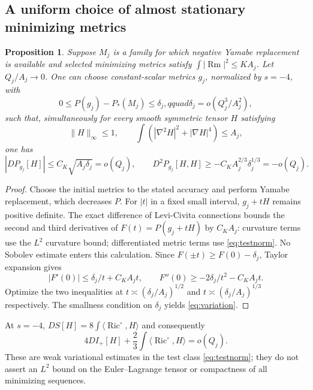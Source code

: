 \documentclass[11pt,a4paper]{article}
\newtheorem{proposition}[theorem]{Proposition}
\theoremstyle{definition}\newtheorem{definition}[theorem]{Definition}
\theoremstyle{remark}\newtheorem{remark}[theorem]{Remark}
\newcommand{\Ric}{\operatorname{Ric}}
\newcommand{\Rm}{\operatorname{Rm}}
\newcommand{\ip}[2]{\langle #1,#2\rangle}
\newcommand{\norm}[1]{\lVert #1\rVert}
\begin{document}
\subsection{A uniform choice of almost stationary minimizing metrics}
\begin{proposition}\label{prop:selection}
Suppose $M_j$ is a family for which negative Yamabe replacement is available and selected minimizing metrics satisfy $\int|\Rm|^2\le KA_j$. Let $Q_j/A_j\to0$. One can choose constant-scalar metrics $g_j$, normalized by $s=-4$, with
\[
 0\le P(g_j)-P_*(M_j)\le\delta_j,qquad \delta_j=o(Q_j^3/A_j^2),
\]
such that, simultaneously for every smooth symmetric tensor $H$ satisfying
\begin{equation}\label{eq:testnorm}
 \norm H_\infty\le1,\qquad\int(|\nabla^2H|^2+|\nabla H|^4)\le A_j,
\end{equation}
one has
\begin{equation}\label{eq:variation}
 |DP_{g_j}[H]|\le C_K\sqrt{A_j\delta_j}=o(Q_j),\qquad
 D^2P_{g_j}[H,H]\ge-C_KA_j^{2/3}\delta_j^{1/3}=-o(Q_j).
\end{equation}
\end{proposition}
\begin{proof}
Choose the initial metrics to the stated accuracy and perform Yamabe replacement, which decreases $P$. For $|t|$ in a fixed small interval, $g_j+tH$ remains positive definite. The exact difference of Levi-Civita connections bounds the second and third derivatives of $F(t)=P(g_j+tH)$ by $C_KA_j$: curvature terms use the $L^2$ curvature bound; differentiated metric terms use \eqref{eq:testnorm}. No Sobolev estimate enters this calculation. Since $F(\pm t)\ge F(0)-\delta_j$, Taylor expansion gives
\[
 |F'(0)|\le\delta_j/t+C_KA_jt,
 \qquad F''(0)\ge-2\delta_j/t^2-C_KA_jt.
\]
Optimize the two inequalities at $t\asymp(\delta_j/A_j)^{1/2}$ and $t\asymp(\delta_j/A_j)^{1/3}$ respectively. The smallness condition on $\delta_j$ yields \eqref{eq:variation}.
\end{proof}
At $s=-4$, $DS[H]=8\int\ip{\Ric^\circ}{H}$ and consequently
\[
 4DI_+[H]+\frac23\int\ip{\Ric^\circ}{H}=o(Q_j).
\]
These are weak variational estimates in the test class \eqref{eq:testnorm}; they do not assert an $L^2$ bound on the Euler--Lagrange tensor or compactness of all minimizing sequences.
\end{document}
